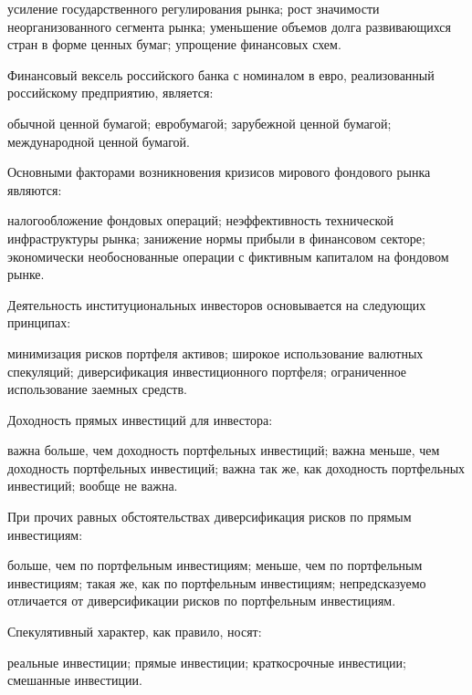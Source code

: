 \documentclass[12pt, table]{exam}
\begin{document}
\begin{questions}
\begin{multicols}{2}
	 \begin{choices}
	 \choice усиление государственного регулирования рынка;
	 \choice рост значимости неорганизованного сегмента рынка;
	 \CC уменьшение объемов долга развивающихся стран в форме ценных бумаг;
	 \choice упрощение финансовых схем.
	 \end{choices}
\question  Финансовый вексель российского банка с номиналом в евро, реализованный российскому предприятию, является:
	 \begin{choices}
	 \choice обычной ценной бумагой;
	 \choice евробумагой;
	 \choice зарубежной ценной бумагой;
	 \CC международной ценной бумагой.
	 \end{choices}
\question  Основными факторами возникновения кризисов мирового фондового рынка являются:
	 \begin{choices}
	 \choice налогообложение фондовых операций;
	 \choice неэффективность технической инфраструктуры рынка;
	 \choice занижение нормы прибыли в финансовом секторе;
	 \CC экономически необоснованные операции с фиктивным капиталом на фондовом рынке.
	 \end{choices}
\question  Деятельность институциональных инвесторов основывается на следующих принципах:
	 \begin{choices}
	 \CC минимизация рисков портфеля активов;
	 \choice широкое использование валютных спекуляций;
	 \choice диверсификация инвестиционного портфеля;
	 \choice ограниченное использование заемных средств.
	 \end{choices}
\question  Доходность прямых инвестиций для инвестора:
	 \begin{choices}
	 \CC важна больше, чем доходность портфельных инвестиций;
	 \choice важна меньше, чем доходность портфельных инвестиций;
	 \choice важна так же, как доходность портфельных инвестиций;
	 \choice вообще не важна.
	 \end{choices}
\question  При прочих равных обстоятельствах диверсификация рисков по прямым инвестициям:
	 \begin{choices}
	 \choice больше, чем по портфельным инвестициям;
	 \CC меньше, чем по портфельным инвестициям;
	 \choice такая же, как по портфельным инвестициям;
	 \choice непредсказуемо отличается от диверсификации рисков по портфельным инвестициям.
	 \end{choices}
\question  Спекулятивный характер, как правило, носят:
	 \begin{choices}
	 \choice реальные инвестиции;
	 \choice прямые инвестиции;
	 \CC краткосрочные инвестиции;
	 \choice смешанные инвестиции.

\end{choices}
\end{multicols}
\end{questions}
\end{document}
